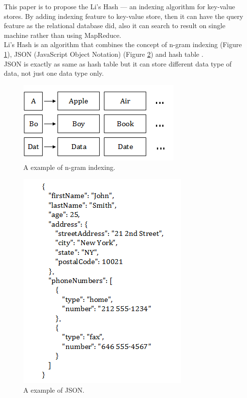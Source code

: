 This paper is to propose the Li's Hash --- an indexing algorithm for key-value stores. By adding indexing feature to key-value store, then it can have the query feature as the relational database did, also it can search to result on single machine rather than using MapReduce.\\

Li's Hash is an algorithm that combines the concept of n-gram indexing \cite{web:wiki:n-gram} (Figure \ref{fig:intro:n-gram}), JSON (JavaScript Object Notation) \cite{web:wiki:json} (Figure \ref{fig:intro:json_example}) and hash table \cite{web:wiki:hash-table}.\\

JSON is exactly as same as hash table but it can store different data type of data, not just one data type only.

\begin{figure}[h]
\centering
\includegraphics[scale=0.6]{./introduction/pic/n-gram_v1.png}
\caption{A example of n-gram indexing.}
\label{fig:intro:n-gram}
\end{figure}

\begin{figure}[h]
\centering
\includegraphics[scale=0.6]{./introduction/pic/json_example_v1.png}
\caption{A example of JSON.}
\label{fig:intro:json_example}
\end{figure}

